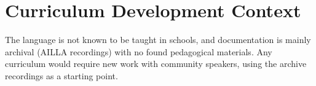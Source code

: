 \documentclass[12pt]{article}
\begin{document}
\section{Curriculum Development Context}
The language is not known to be taught in schools, and documentation is mainly archival (AILLA recordings) with no found pedagogical materials. Any curriculum would require new work with community speakers, using the archive recordings as a starting point.
\end{document}
